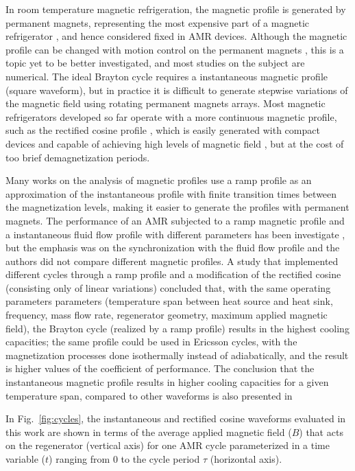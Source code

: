 \documentclass[draft]{svjour3}
\begin{document}
In room temperature magnetic refrigeration, the magnetic profile is generated by permanent magnets, representing the most expensive part of a magnetic refrigerator \cite{bib:bjoerk16_lifetime}, and hence considered fixed in AMR devices. Although the magnetic profile can be changed with motion control on the permanent magnets \cite{bib:benedict16_desig}, this is a topic yet to be better investigated, and most studies on the subject are numerical. The ideal Brayton cycle requires a instantaneous magnetic profile (square waveform), but in practice it is difficult to generate  stepwise variations of the magnetic field  using rotating permanent magnets arrays. Most magnetic refrigerators developed so far operate with a more continuous magnetic profile, such as the rectified cosine profile \cite{bib:tura-rowe-amr,bib:arnold14_desig,bib:trevizoli15_desig_halbac}, which is easily generated with compact devices and capable of achieving high levels of magnetic field \cite{bib:trevizoli16_pump}, but at the cost of  too brief demagnetization periods.

Many works on the analysis of  magnetic profiles use a ramp profile as  an approximation of the instantaneous profile with finite transition times between the magnetization levels, making it easier to generate the profiles with permanent magnets. The performance of an AMR subjected to a ramp magnetic profile and a instantaneous fluid flow profile with different parameters has been investigate \cite{bib:bjoerk11_amr}, but the emphasis was on the synchronization with the fluid flow profile and the authors did not compare different magnetic profiles. A study that  implemented different cycles through a ramp profile and a modification of the rectified cosine (consisting only of linear variations) \cite{bib:kitanovski} concluded that, with the same operating parameters parameters (temperature span between heat source and heat sink, frequency, mass flow rate, regenerator geometry, maximum applied magnetic field), the Brayton cycle (realized by a ramp profile) results in the highest cooling capacities; the same profile could be used in Ericsson cycles, with the magnetization processes done isothermally instead of adiabatically, and the result is higher values of the coefficient of performance. The conclusion that the instantaneous magnetic profile results in higher cooling capacities for a given temperature span, compared to other waveforms is also presented in \cite{bib:asme-mce}


In Fig.~\ref{fig:cycles}, the instantaneous and rectified cosine waveforms evaluated in this work are shown in terms of the average applied magnetic field (${B}$) that acts on the regenerator (vertical axis) for one AMR cycle parameterized in a time variable ($t$) ranging from 0 to the cycle period $\tau$ (horizontal axis).  
\end{document}
